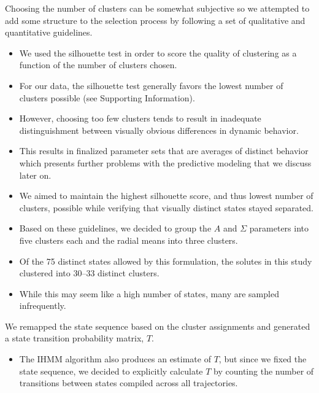 \documentclass{article}
\begin{document}
  Choosing the number of clusters can be somewhat subjective so
  we attempted to add some structure to the selection process by following
  a set of qualitative and quantitative guidelines.
  \begin{itemize}
    \item We used the silhouette test in order to score the quality of
    clustering as a function of the number of clusters chosen.
    \item For our data, the silhouette test generally favors the lowest number
    of clusters possible (see Supporting Information).
    \item However, choosing too few clusters tends to result in 
    inadequate distinguishment between visually obvious differences in 
    dynamic behavior.
    \item This results in finalized parameter sets that are averages of
    distinct behavior which presents further problems with the predictive
    modeling that we discuss later on.
    \item We aimed to maintain the highest silhouette score, and thus lowest
    number of clusters, possible while verifying that visually distinct 
    states stayed separated.
    \item Based on these guidelines, we decided to group the $A$ and $\Sigma$
    parameters into five clusters each and the radial means into three clusters. 
	\item Of the 75 distinct states allowed by this formulation, the solutes
	in this study clustered into 30--33 distinct clusters.  %
	\item While this may seem like a high number of states, many are sampled
	infrequently.
  \end{itemize}

  \noindent We remapped the state sequence based on the cluster assignments and
  generated a state transition probability matrix, $T$.
  \begin{itemize}
   \item The IHMM algorithm also produces an estimate of $T$, but since we 
   fixed the state sequence, we decided to explicitly calculate $T$ by 
   counting the number of transitions between states compiled across all 
   trajectories.
  \end{itemize}  
  
\end{document}
